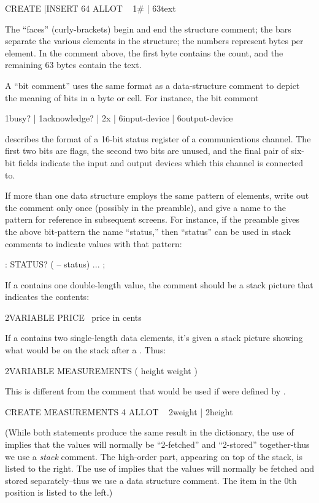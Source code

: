 \begin{Code}
CREATE |INSERT  64 ALLOT  \  { 1# | 63text }
\end{Code}
The ``faces'' (curly-brackets) begin and end the structure comment;
the bars separate the various elements in the structure; the numbers
represent bytes per element.  In the comment above, the first byte
contains the count, and the remaining 63 bytes contain the text.

A ``bit comment'' uses the same format as a data-structure comment to
depict the meaning of bits in a byte or cell.  For instance, the bit
comment
\begin{Code}
{ 1busy? | 1acknowledge? | 2x | 6input-device |
   6output-device }
\end{Code}
describes the format of a 16-bit status register of a communications
channel.  The first two bits are flags,
the second two bits are unused, and the final pair of six-bit fields
indicate the input and output devices which this channel is connected
to.

If more than one data structure employs the same pattern of elements,
write out the comment only once (possibly in the preamble), and
give a name to the pattern for reference in subsequent screens.  For
instance, if the preamble gives the above bit-pattern the name
``status,'' then ``status'' can be used in stack comments to indicate
values with that pattern:
\begin{Code}
: STATUS?  ( -- status) ... ;
\end{Code}
If a  contains one double-length value, the comment
should be a stack picture that indicates the contents:
\begin{Code}
2VARIABLE PRICE  \ price in cents
\end{Code}
If a  contains two single-length data elements, it's
given a stack picture showing what would be on the stack after a
. Thus:
\begin{Code}
2VARIABLE MEASUREMENTS  ( height weight )
\end{Code}
This is different from the comment that would be used if
 were defined by .
\begin{Code}
CREATE MEASUREMENTS  4 ALLOT    \ { 2weight | 2height }
\end{Code}
(While both statements produce the same result in the dictionary, the
use of  implies that the values will normally be
``2-fetched'' and ``2-stored'' together-thus we use a \emph{stack}
comment.  The high-order part, appearing on top of the stack, is
listed to the right.  The use of  implies that the
values will normally be fetched and stored separately--thus we use a
data structure comment.  The item in the 0th position is listed to the
left.)%

